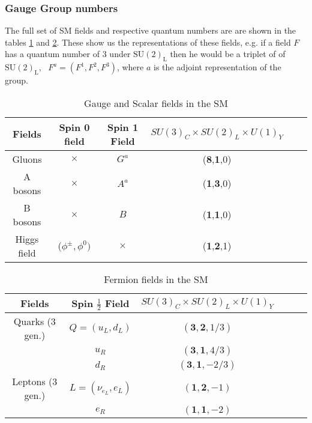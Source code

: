 
\subsubsection{Gauge Group numbers}

The full set of SM fields and respective quantum numbers are are shown in the tables \ref{table1} and \ref{table2}. These show us the representations of these fields, e.g. if a field $F$ has a quantum number of 3 under $\mathrm{SU(2)_L}$ then he would be a triplet of of $\mathrm{SU(2)_L}$, \ $F^a = (F^1,F^2,F^3)$, where $a$ is the adjoint representation of the group.   
%
\begin{table}[H]
\centering
\caption{Gauge and Scalar fields in the SM}
\label{table1}
\begin{tabular}{@{}cccccc@{}}
  \hline	
 Fields & Spin 0 field & Spin 1 Field & $SU(3)_C \times SU(2)_L \times U(1)_Y$  \\
  \hline	
 Gluons  & $\times$  & $G^a$ & (\textbf{8},\textbf{1},0) \\	
A bosons & $\times$  & $A^a$ & (\textbf{1},\textbf{3},0)   \\
B bosons & $\times$  & $B$   & (\textbf{1},\textbf{1},0)   \\
Higgs field & ($\phi^\pm, \phi^0 )$  & $\times$ & (\textbf{1},\textbf{2},1) \\ \hline
\end{tabular}
\end{table}
%
\begin{table}[H]
\centering
\caption{Fermion fields in the SM}
\label{table2}
\begin{tabular}{@{}cccccc@{}}
  \hline	
 Fields & Spin $\frac{1}{2}$ Field & $SU(3)_C \times SU(2)_L \times U(1)_Y$  \\
  \hline	
Quarks (3 gen.) & $Q=(u_L,d_L)$ & $(\mathbf{3},\mathbf{2},{1}/{3})$ \\	
$\quad$        & $u_R$ & $(\mathbf{3},\mathbf{1},{4}/{3})$   \\
$\quad$   & $d_R$ & $(\mathbf{3},\mathbf{1}, -{2}/{3})$   \\
Leptons (3 gen.) & $L=(\nu_{e_L}, e_L )$ & $(\mathbf{1},\mathbf{2},-1)$  \\
$\quad$   & $e_R$ & $(\mathbf{1},\mathbf{1},-2)   $ \\ \hline
%
\end{tabular}
\end{table}
